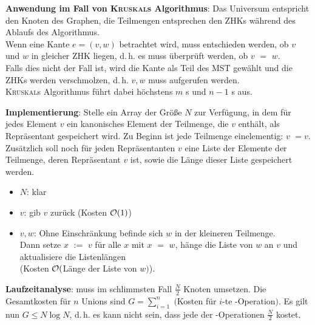 \textbf{Anwendung im Fall von \textsc{Kruskal}s Algorithmus}:
Das Universum entspricht den Knoten des Graphen,
die Teilmengen entsprechen den ZHKs während des Ablaufs des Algorithmus. \\
Wenn eine Kante $e = (v, w)$ betrachtet wird, muss entschieden werden,
ob $v$ und $w$ in gleicher ZHK liegen, d.\,h. es muss überprüft werden, ob
$v$\code{)} $=$ $w$\code{)}. \\
Falls dies nicht der Fall ist, wird die Kante als Teil des MST gewählt und
die ZHKs werden verschmolzen, d.\,h. $v, w$\code{)} muss
aufgerufen werden. \\
\textsc{Kruskal}s Algorithmus führt dabei höchstens $m$ s und
$n - 1$ s aus.

\linie
\pagebreak

\textbf{Implementierung}:
Stelle ein Array  der Größe $N$ zur Verfügung, in dem für jedes
Element $v$ ein kanonisches Element der Teilmenge, die $v$ enthält,
als Repräsentant gespeichert wird.
Zu Beginn ist jede Teilmenge einelementig: \code{TM[}$v$\code{]} $= v$. \\
Zusätzlich soll noch für jeden Repräsentanten $v$ eine Liste der Elemente der
Teilmenge, deren Repräsentant $v$ ist, sowie die Länge dieser Liste
gespeichert werden.

\begin{itemize}
    \item
    \textbf{$N$\code{)}}:
    klar
    
    \item
    \textbf{$v$\code{)}}:
    gib \code{TM[}$v$\code{]} zurück
    (Kosten $\mathcal{O}(1)$)
    
    \item
    \textbf{$v, w$\code{)}}:
    Ohne Einschränkung befinde sich $w$ in der kleineren Teilmenge. \\
    Dann setze \code{TM[}$x$\code{]} $:=$ $v$\code{)} für alle
    $x$ mit \code{TM[}$x$\code{]} $=$ $w$\code{)}, hänge die
    Liste von $w$\code{)} an $v$\code{)} und
    aktualisiere die Listenlängen \\
    (Kosten $\mathcal{O}($Länge der Liste von $w$\code{)}$)$).
\end{itemize}

\linie

\textbf{Laufzeitanalyse}:
 muss im schlimmsten Fall $\frac{N}{2}$ Knoten umsetzen.
Die Gesamtkosten für $n$ Unions sind
$G = \sum_{i=1}^n \;($Kosten für $i$-te -Operation$)$.
Es gilt nun $G \le N \log N$, d.\,h. es kann nicht sein, dass jede der
-Operationen $\frac{N}{2}$ kostet.


